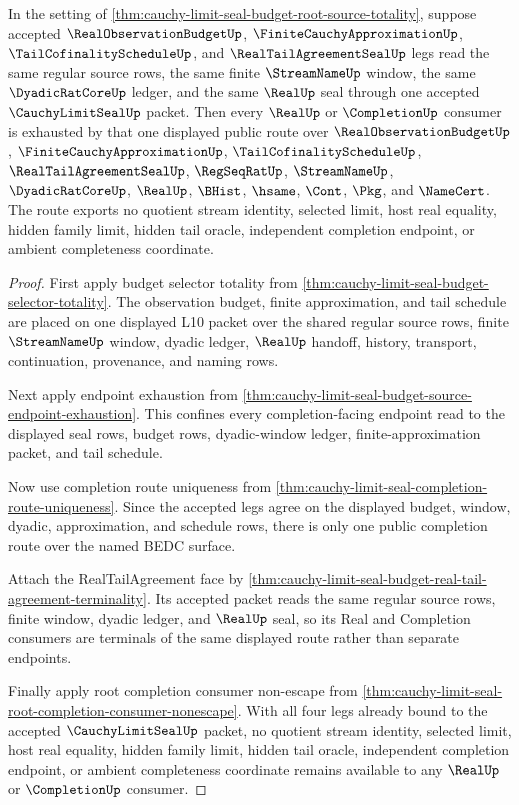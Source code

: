 \begin{theorem}
\label{thm:cauchy-limit-seal-terminal-route-exhaustion}
In the setting of \autoref{thm:cauchy-limit-seal-budget-root-source-totality}, suppose accepted $\RealObservationBudgetUp$, $\FiniteCauchyApproximationUp$, $\TailCofinalityScheduleUp$, and $\RealTailAgreementSealUp$ legs read the same regular source rows, the same finite $\StreamNameUp$ window, the same $\DyadicRatCoreUp$ ledger, and the same $\RealUp$ seal through one accepted $\CauchyLimitSealUp$ packet. Then every $\RealUp$ or $\CompletionUp$ consumer is exhausted by that one displayed public route over $\RealObservationBudgetUp$, $\FiniteCauchyApproximationUp$, $\TailCofinalityScheduleUp$, $\RealTailAgreementSealUp$, $\RegSeqRatUp$, $\StreamNameUp$, $\DyadicRatCoreUp$, $\RealUp$, $\BHist$, $\hsame$, $\Cont$, $\Pkg$, and $\NameCert$. The route exports no quotient stream identity, selected limit, host real equality, hidden family limit, hidden tail oracle, independent completion endpoint, or ambient completeness coordinate.
\end{theorem}
\begin{proof}
First apply budget selector totality from \autoref{thm:cauchy-limit-seal-budget-selector-totality}. The observation budget, finite approximation, and tail schedule are placed on one displayed L10 packet over the shared regular source rows, finite $\StreamNameUp$ window, dyadic ledger, $\RealUp$ handoff, history, transport, continuation, provenance, and naming rows.

Next apply endpoint exhaustion from \autoref{thm:cauchy-limit-seal-budget-source-endpoint-exhaustion}. This confines every completion-facing endpoint read to the displayed seal rows, budget rows, dyadic-window ledger, finite-approximation packet, and tail schedule.

Now use completion route uniqueness from \autoref{thm:cauchy-limit-seal-completion-route-uniqueness}. Since the accepted legs agree on the displayed budget, window, dyadic, approximation, and schedule rows, there is only one public completion route over the named BEDC surface.

Attach the RealTailAgreement face by \autoref{thm:cauchy-limit-seal-budget-real-tail-agreement-terminality}. Its accepted packet reads the same regular source rows, finite window, dyadic ledger, and $\RealUp$ seal, so its Real and Completion consumers are terminals of the same displayed route rather than separate endpoints.

Finally apply root completion consumer non-escape from \autoref{thm:cauchy-limit-seal-root-completion-consumer-nonescape}. With all four legs already bound to the accepted $\CauchyLimitSealUp$ packet, no quotient stream identity, selected limit, host real equality, hidden family limit, hidden tail oracle, independent completion endpoint, or ambient completeness coordinate remains available to any $\RealUp$ or $\CompletionUp$ consumer.
\end{proof}

